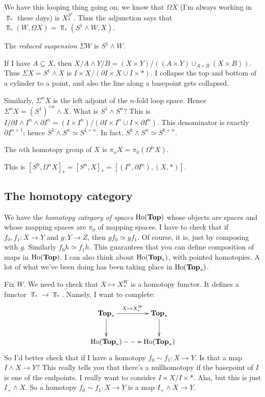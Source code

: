 We have this looping thing going on; we know that $\Omega X$ (I'm always working in $\Top_\ast$ these days) is $X^{S^1}_\ast$. Thus the adjunction says that $\Top_\ast(W,\Omega X) = \Top_\ast(S^1\wedge W,X)$.
\begin{definition}
    The \emph{reduced suspension} $\Sigma W$ is $S^1\wedge W$.
\end{definition}
If I have $A\subseteq X$, then $X/A\wedge Y/B = (X\times Y)/((A\times Y)\cup_{A\times B}(X\times B))$. Thus $\Sigma X = S^1\wedge X$ is $I\times X/(\partial I \times X\cup I\times \ast)$. I collapse the top and bottom of a cylinder to a point, and also the line along a basepoint gets collapsed.

Similarly, $\Sigma^n X$ is the left adjoint of the $n$-fold loop space. Hence $\Sigma^n X = (S^1)^{\wedge n}\wedge X$. What is $S^1\wedge S^n$? This is $I/\partial I\wedge I^n\wedge \partial I^n = (I\times I^n)/(\partial I\times I^n\cup I\times \partial I^n)$. This denominator is exactly $\partial I^{n+1}$; hence $S^1\wedge S^n\simeq S^{1+n}$. In fact, $S^k\wedge S^n\simeq S^{k+n}$.
\begin{definition}
    The $n$th homotopy group of $X$ is $\pi_n X = \pi_0(\Omega^n X)$.
\end{definition}
This is $[S^0,\Omega^n X]_\ast = [S^n, X]_\ast = [(I^n,\partial I^n),(X,\ast)]$.
\subsection{The homotopy category}
We have the \emph{homotopy category of spaces} $\mathrm{Ho}(\mathbf{Top})$ whose objects are spaces and whose mapping spaces are $\pi_0$ of mapping spaces. I have to check that if $f_0,f_1:X\to Y$ and $g:Y\to Z$, then $gf_0\simeq gf_1$. Of course, it is, just by composing with $g$. Similarly $f_0h\simeq f_1h$. This guarantees that you can define composition of maps in $\mathrm{Ho}(\mathbf{Top})$. I can also think about $\mathrm{Ho}(\mathbf{Top}_\ast)$, with pointed homotopies. A lot of what we've been doing has been taking place in $\mathrm{Ho}(\mathbf{Top}_\ast)$.

Fix $W$. We need to check that $X\mapsto X^W_\ast$ is a homotopy functor. It defines a functor $\Top_\ast\to\Top_\ast$. Namely, I want to complete:
\begin{equation*}
    \xymatrix{
	\Top_\ast\ar[d]\ar[r]^{X\mapsto X^W_\ast} & \Top_\ast\ar[d]\\
	\Ho(\Top_\ast)\ar@{-->}[r] & \Ho(\Top_\ast)
    }
\end{equation*}
So I'd better check that if I have a homotopy $f_0\sim f_1:X\to Y$. Is that a map $I\wedge X\to Y$? This really tells you that there's a nullhomotopy if the basepoint of $I$ is one of the endpoints. I really want to consider $I\times X/I\times\ast$. Aha, but this is just $I_+\wedge X$. So a homotopy $f_0\sim f_1:X\to Y$ is a map $I_+\wedge X\to Y$.

